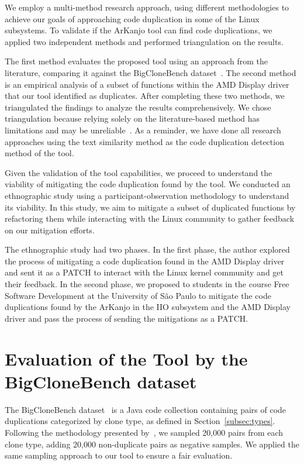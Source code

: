 
We employ a multi-method research approach, using different methodologies to achieve our 
goals of approaching code duplication in some of the Linux subsystems. To validate if the 
ArKanjo tool can find code duplications, we applied two independent methods and performed 
triangulation on the results.

The first method evaluates the proposed tool using an approach from the literature, 
comparing it against the BigCloneBench dataset~\citep{bigclonebench}. 
The second method is an empirical analysis of a subset of functions within the 
AMD Display driver that our tool identified as duplicates. After completing these two 
methods, we triangulated the findings to analyze the results comprehensively. 
We chose triangulation because relying solely on the literature-based method has 
limitations and may be unreliable~\citep{bigfail,litreview}. 
As a reminder, we have done all research approaches using the text similarity method 
as the code duplication detection method of the tool.

Given the validation of the tool capabilities, we proceed to understand the viability 
of mitigating the code duplication found by the tool. We conducted an ethnographic study 
using a participant-observation methodology to understand its viability. In this study, 
we aim to mitigate a subset of duplicated functions by refactoring them while interacting 
with the Linux community to gather feedback on our mitigation efforts.

The ethnographic study had two phases. In the first phase, the author explored the process 
of mitigating a code duplication found in the AMD Display driver and sent it as a PATCH to 
interact with the Linux kernel community and get their feedback. In the second phase, we proposed 
to students in the course Free Software Development at the University of São Paulo to mitigate 
the code duplications found by the ArKanjo in the IIO subsystem and the AMD Display driver and 
pass the process of sending the mitigations as a PATCH.

\section{Evaluation of the Tool by the BigCloneBench dataset}
\label{sec:metbig}

The BigCloneBench dataset~\citep{bigclonebench} is a Java code collection containing pairs of code duplications categorized by clone type, as defined in Section~\ref{subsec:types}.
%
Following the methodology presented by~\citep{tailor}, we sampled 20,000 pairs from each clone type, adding 20,000 non-duplicate pairs as negative samples. We applied the same sampling approach to our tool to ensure a fair evaluation.

